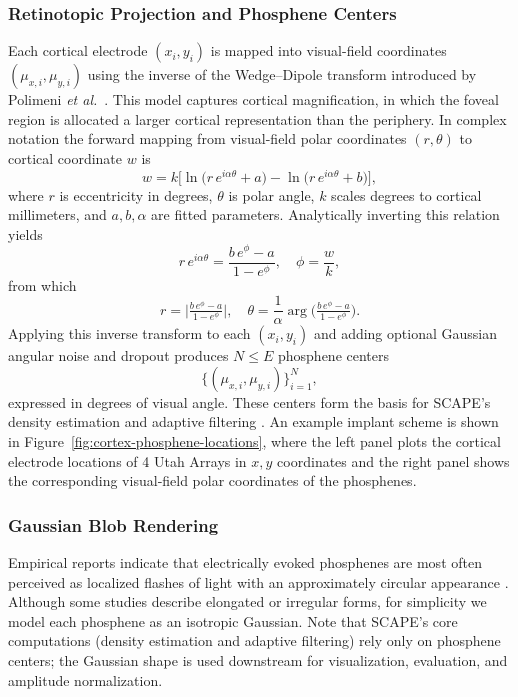 \subsubsection{Retinotopic Projection and Phosphene Centers}
Each cortical electrode \((x_i,y_i)\) is mapped into visual-field coordinates \((\mu_{x,i},\mu_{y,i})\) using the inverse of the Wedge–Dipole transform introduced by Polimeni \emph{et al.}\ \cite{Polimeni2006}. This model captures cortical magnification, in which the foveal region is allocated a larger cortical representation than the periphery. In complex notation the forward mapping from visual-field polar coordinates \((r,\theta)\) to cortical coordinate \(w\) is
\[
w = k\bigl[\ln\bigl(r\,e^{i\alpha\theta} + a\bigr) 
       - \ln\bigl(r\,e^{i\alpha\theta} + b\bigr)\bigr],
\]
where \(r\) is eccentricity in degrees, \(\theta\) is polar angle, \(k\) scales degrees to cortical millimeters, and \(a,b,\alpha\) are fitted parameters. Analytically inverting this relation yields
\[
r\,e^{i\alpha\theta}
  = \frac{b\,e^{\phi} - a}{1 - e^{\phi}},
\quad
\phi = \frac{w}{k},
\]
from which
\[
r = \bigl|\tfrac{b\,e^{\phi} - a}{1 - e^{\phi}}\bigr|,
\quad
\theta = \frac{1}{\alpha}\arg\!\bigl(\tfrac{b\,e^{\phi} - a}{1 - e^{\phi}}\bigr).
\]
Applying this inverse transform to each \((x_i,y_i)\) and adding optional Gaussian angular noise and dropout produces \(N\le E\) phosphene centers
\[
\{(\mu_{x,i},\mu_{y,i})\}_{i=1}^N,
\]
expressed in degrees of visual angle. These centers form the basis for SCAPE’s density estimation and adaptive filtering \cite{vanderGrinten2024}. An example implant scheme is shown in Figure~\ref{fig:cortex-phosphene-locations}, where the left panel plots the cortical electrode locations of 4 Utah Arrays in \(x,y\) coordinates and the right panel shows the corresponding visual‐field polar coordinates of the phosphenes.


\subsubsection{Gaussian Blob Rendering}
Empirical reports indicate that electrically evoked phosphenes are most often perceived as localized flashes of light with an approximately circular appearance \cite{vanderGrinten2024}. Although some studies describe elongated or irregular forms, for simplicity we model each phosphene as an isotropic Gaussian. Note that SCAPE’s core computations (density estimation and adaptive filtering) rely only on phosphene centers; the Gaussian shape is used downstream for visualization, evaluation, and amplitude normalization.

